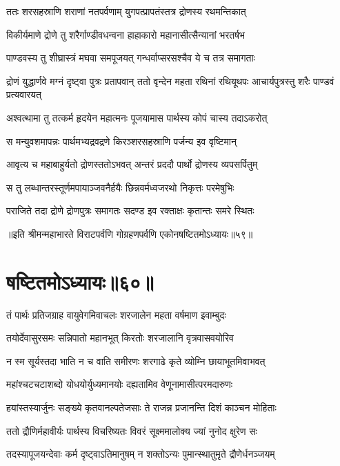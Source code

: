 \twolineshloka
{ततः शरसहस्राणि शराणां नतपर्वणाम्}
{युगपत्प्रापतंस्तत्र द्रोणस्य रथमन्तिकात्}


\twolineshloka
{विकीर्यमाणे द्रोणे तु शरैर्गाण्डीवधन्वना}
{हाहाकारो महानासीत्सैन्यानां भरतर्षभ}


\twolineshloka
{पाण्डवस्य तु शीघ्रास्त्रं मघवा समपूजयत्}
{गन्धर्वाप्सरसश्चैव ये च तत्र समागताः}


\threelineshloka
{द्रोणं युद्धार्णवे मग्नं दृष्ट्वा पुत्रः प्रतापवान्}
{ततो वृन्देन महता रथिनां रथियूथपः}
{आचार्यपुत्रस्तु शरैः पाण्डवं प्रत्यवारयत्}


\twolineshloka
{अश्वत्थामा तु तत्कर्म हृदयेन महात्मनः}
{पूजयामास पार्थस्य कोपं चास्य तदाऽकरोत्}


\twolineshloka
{स मन्युवशमापन्नः पार्थमभ्यद्रवद्रणे}
{किरञ्शरसहस्राणि पर्जन्य इव वृष्टिमान्}


\twolineshloka
{आवृत्य च महाबाहुर्यतो द्रोणस्ततोऽभवत्}
{अन्तरं प्रददौ पार्थो द्रोणस्य व्यपसर्पितुम्}


\twolineshloka
{स तु लब्धान्तरस्तूर्णमपायाञ्जवनैर्हयैः}
{छिन्नवर्मध्वजरथो निकृत्तः परमेषुभिः}


\twolineshloka
{पराजिते तदा द्रोणे द्रोणपुत्रः समागतः}
{सदण्ड इव रक्ताक्षः कृतान्तः समरे स्थितः}

॥इति श्रीमन्महाभारते विराटपर्वणि गोग्रहणपर्वणि एकोनषष्टितमोऽध्यायः॥५९॥

\chapter{षष्टितमोऽध्यायः॥६०॥}

\twolineshloka
{तं पार्थः प्रतिजग्राह वायुवेगमिवाचलः}
{शरजालेन महता वर्षमाण इवाम्बुदः}


\twolineshloka
{तयोर्देवासुरसमः सन्निपातो महानभूत्}
{किरतोः शरजालानि वृत्रवासवयोरिव}


\twolineshloka
{न स्म सूर्यस्तदा भाति न च वाति समीरणः}
{शरगाढे कृते व्योम्नि छायाभूतमिवाभवत्}


\twolineshloka
{महांश्चटचटाशब्दो योधयोर्युध्यमानयोः}
{दह्यतामिव वेणूनामासीत्परमदारुणः}


\twolineshloka
{हयांस्तस्यार्जुनः सङ्ख्ये कृतवानल्पतेजसाः}
{ते राजन्न प्रजानन्ति दिशं काञ्चन मोहिताः}


\twolineshloka
{ततो द्रौणिर्महावीर्यः पार्थस्य विचरिष्यतः}
{विवरं सूक्ष्ममालोक्य ज्यां नुनोद क्षुरेण सः}


\twolineshloka
{तदस्यापूजयन्देवाः कर्म दृष्ट्वाऽतिमानुषम्}
{न शक्तोऽन्यः पुमान्स्थातुमृते द्रौणेर्धनञ्जयम्}


